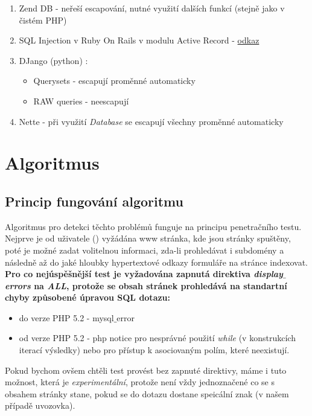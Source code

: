 \documentclass[12pt, a4paper]{report}
\begin{document}
\begin{enumerate}
\item Zend DB - neřeší escapování, nutné využití dalších funkcí (stejně jako v čistém PHP)
\item SQL Injection v Ruby On Rails v modulu Active Record - \href{https://groups.google.com/forum/?fromgroups=#!topic/rubyonrails-security/dUaiOOGWL1k}{odkaz}
\item DJango (python) :
\begin{itemize}
\item Querysets - escapují proměnné automaticky
\item RAW queries - neescapují
\end{itemize}
\item Nette - při využití \textit{Database} se escapují všechny proměnné automaticky
\end{enumerate}





\chapter{Algoritmus}
\section{Princip fungování algoritmu}
Algoritmus pro detekci těchto problémů funguje na principu penetračního testu. Nejprve je od uživatele () vyžádána www stránka, kde jsou stránky spuštěny, poté je možné zadat volitelnou informaci, zda-li prohledávat i subdomény a následně až do jaké hloubky hypertextové odkazy \/ formuláře na stránce indexovat. \textbf{Pro co nejúspěšnější test je vyžadována zapnutá direktiva \textit{display$\_$errors} na \textit{ALL}, protože se obsah stránek prohledává na standartní chyby způsobené úpravou SQL dotazu:}
\begin{itemize}
\item do verze PHP 5.2 - mysql$\_$error
\item od verze PHP 5.2 - php notice pro nesprávné použití \textit{while} (v konstrukcích iterací výsledky) nebo pro přístup k asociovaným polím, které neexistují.
\end{itemize}
Pokud bychom ovšem chtěli test provést bez zapnuté direktivy, máme i tuto možnost, která je \textit{experimentální}, protože není vždy jednoznačené co se s obsahem stránky stane, pokud se do dotazu dostane speicální znak (v našem případě uvozovka).
\end{document}
